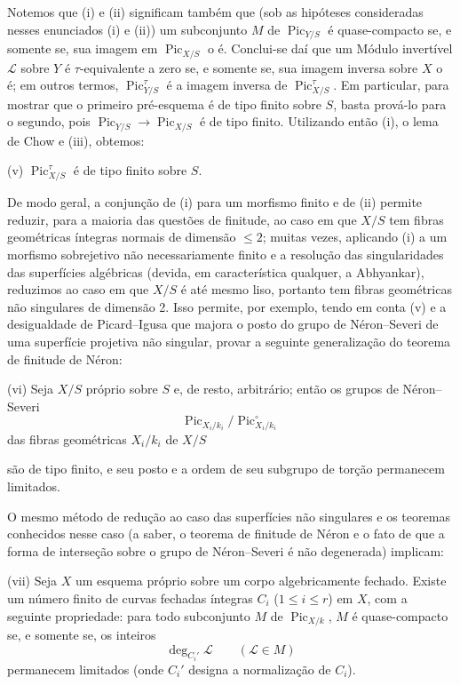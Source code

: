\documentclass[11pt,twoside,openany]{book}
\numberwithin{equation}{section}
\newcommand{\src}[1]{%
  \phantomsection\hypertarget{src:#1}{}%
  \marginpar{\raggedleft\footnotesize\sffamily #1}%
}
\theoremstyle{plain}
\theoremstyle{definition}
\theoremstyle{remark}
\newcommand{\FgaUnitKey}{frontmatter}
\renewcommand{\src}[1]{%
  \phantomsection\hypertarget{src:\FgaUnitKey:#1}{}%
  \marginpar{\raggedleft\footnotesize\sffamily #1}%
}
\begin{document}
Notemos que (i) e (ii) significam também que (sob as hipóteses consideradas
nesses enunciados (i) e (ii)) um subconjunto $M$ de
$\operatorname{Pic}_{Y/S}$ é quase-compacto se, e somente se, sua imagem em
$\operatorname{Pic}_{X/S}$ o é. Conclui-se daí que um Módulo invertível
$\mathcal L$ sobre $Y$ é $\tau$-equivalente a zero se, e somente se, sua imagem
inversa sobre $X$ o é; em outros termos, $\operatorname{Pic}_{Y/S}^\tau$ é a
imagem inversa de $\operatorname{Pic}_{X/S}^\tau$. Em particular, para mostrar
que o primeiro pré-esquema é de tipo finito sobre $S$, basta prová-lo para o
segundo, pois $\operatorname{Pic}_{Y/S}\longrightarrow
\operatorname{Pic}_{X/S}$ é de tipo finito. Utilizando então (i), o lema de
Chow e (iii), obtemos:

\medskip
\noindent(v) $\operatorname{Pic}_{X/S}^\tau$ é de tipo finito sobre $S$.

De modo geral, a conjunção de (i) para um morfismo finito e de (ii) permite
reduzir, para a maioria das questões de finitude, ao caso em que $X/S$ tem
fibras geométricas íntegras normais de dimensão $\leq2$; muitas vezes, aplicando
(i) a um morfismo sobrejetivo não necessariamente finito e a resolução das
singularidades das superfícies algébricas (devida, em característica qualquer,
a Abhyankar), reduzimos ao caso em que $X/S$ é até mesmo liso, portanto tem
fibras geométricas não singulares de dimensão 2. Isso permite, por exemplo,
tendo em conta (v) e a desigualdade de Picard--Igusa que majora o posto do grupo
de Néron--Severi de uma superfície projetiva não singular, provar a seguinte
generalização do teorema de finitude de Néron:

\medskip
\noindent(vi) Seja $X/S$ próprio sobre $S$ e, de resto, arbitrário; então os
grupos de Néron--Severi
\[
\operatorname{Pic}_{X_i/k_i}/\operatorname{Pic}_{X_i/k_i}^\circ
\]
das fibras geométricas $X_i/k_i$ de $X/S$
\src{305}
são de tipo finito, e seu posto e a ordem de seu subgrupo de torção permanecem
limitados.

O mesmo método de redução ao caso das superfícies não singulares e os teoremas
conhecidos nesse caso (a saber, o teorema de finitude de Néron e o fato de que a
forma de interseção sobre o grupo de Néron--Severi é não degenerada) implicam:

\medskip
\noindent(vii) Seja $X$ um esquema próprio sobre um corpo algebricamente
fechado. Existe um número finito de curvas fechadas íntegras $C_i$
($1\leq i\leq r$) em $X$, com a seguinte propriedade: para todo subconjunto
$M$ de $\operatorname{Pic}_{X/k}$, $M$ é quase-compacto se, e somente se, os
inteiros
\[
\deg_{C_i'}\mathcal L\qquad(\mathcal L\in M)
\]
permanecem limitados (onde $C_i'$ designa a normalização de $C_i$).
\end{document}
